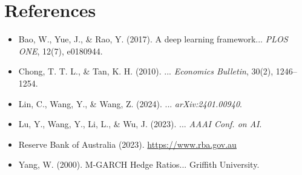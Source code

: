 \documentclass[11pt,a4paper]{article}
\begin{document}
\section*{References}
\begin{itemize}
\item Bao, W., Yue, J., \& Rao, Y. (2017). A deep learning framework... \textit{PLOS ONE}, 12(7), e0180944.
\item Chong, T. T. L., \& Tan, K. H. (2010). ... \textit{Economics Bulletin}, 30(2), 1246--1254.
\item Lin, C., Wang, Y., \& Wang, Z. (2024). ... \textit{arXiv:2401.00940}.
\item Lu, Y., Wang, Y., Li, L., \& Wu, J. (2023). ... \textit{AAAI Conf. on AI}.
\item Reserve Bank of Australia (2023). \url{https://www.rba.gov.au}
\item Yang, W. (2000). M-GARCH Hedge Ratios... Griffith University.
\end{itemize}
\end{document}

